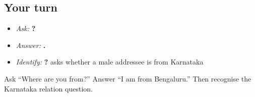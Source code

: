 \subsection*{Your turn}
\begin{itemize}
\raggedright
  \item \emph{Ask:} \textbf{  ?}
  \item \emph{Answer:} \textbf{  .}
  \item \emph{Identify:} \textbf{?} asks whether a male addressee is from Karnataka
\end{itemize}

\begin{tcolorbox}[breakable,colback=teal!4,colframe=teal!35!black,title={Before you move on}]
Ask “Where are you from?” Answer “I am from Bengaluru.” Then recognise the Karnataka relation question.
\end{tcolorbox}
